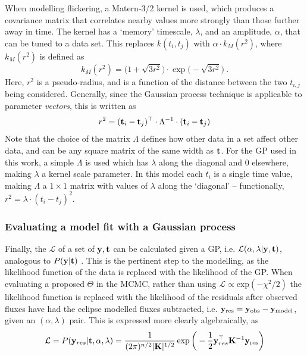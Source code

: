 When modelling flickering, a Matern-3/2 kernel is used, which produces a covariance matrix that correlates nearby values more strongly than those further away in time. The kernel has a `memory' timescale, $\lambda$, and an amplitude, $\alpha$, that can be tuned to a data set. This replaces $k(t_i, t_j)$ with $\alpha \cdot k_{M}(r^2)$, where $k_{M}(r^2)$ is defined as
\begin{equation}
    k_{M}(r^2) = \big(1+\sqrt{3r^2}\big) \cdot\exp\big(-\sqrt{3r^2}\big)\ .
\end{equation}
Here, $r^2$ is a pseudo-radius, and is a function of the distance between the two $t_{i,j}$ being considered. Generally, since the Gaussian process technique is applicable to parameter \textit{vectors}, this is written as
\begin{equation}
    r^2 = ({\bf t}_i - {\bf t}_j)^{\top} \cdot \Lambda^{-1} \cdot ({\bf t}_i - {\bf t}_j)
\end{equation}
Note that the choice of the matrix $\Lambda$ defines how other data in a set affect other data, and can be any square matrix of the same width as $\bf t$. For the GP used in this work, a simple $\Lambda$ is used which has $\lambda$ along the diagonal and 0 elsewhere, making $\lambda$ a kernel scale parameter.
In this model each $t_i$ is a single time value, making $\Lambda$ a $1\times 1$ matrix with values of $\lambda$ along the `diagonal' -- functionally, $r^2 = \lambda \cdot {(t_i - t_j)}^2$.

\subsubsection{Evaluating a model fit with a Gaussian process}
\label{sect:modelling:GP model evaluation}

Finally, the $\mathcal{L}$ of a set of ${\bf y}, {\bf t}$ can be calculated given a GP, i.e. $\mathcal{L}(\alpha, \lambda | {\bf y}, {\bf t})$, analogous to $P({\bf y} | {\bf t})$ \citep{rasmussen2006}.
This is the pertinent step to the modelling, as the likelihood function of the data is replaced with the likelihood of the GP.
When evaluating a proposed $\Theta$ in the MCMC, rather than using $\mathcal{L} \propto \mathrm{exp}(-\chi^2/2)$ the likelihood function is replaced with the likelihood of the residuals after observed fluxes have had the eclipse modelled fluxes subtracted, i.e. ${\bf y}_{\rm res} = {\bf y}_{\rm obs} - {\bf y}_{\rm model}$, given an $(\alpha, \lambda)$ pair. This is expressed more clearly algebraically, as
\begin{equation}
    \mathcal{L} = P({\bf y}_{res} | {\bf t}, \alpha, \lambda) = \frac{1}{(2\pi)^{n/2} |{\bf K}|^{1/2}} \exp \bigg(- \frac{1}{2} {\bf y}_{res}^{\top} {\bf K}^{-1} {\bf y}_{\rm res} \bigg)
\end{equation}


